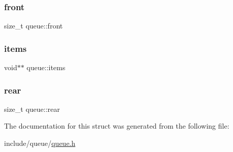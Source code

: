 \subsubsection{\texorpdfstring{front}{front}}
{\footnotesize\ttfamily size\+\_\+t queue\+::front}

\mbox{\label{structqueue_a4c90fc914a6825a61866f13ce4fdb225}} 
\subsubsection{\texorpdfstring{items}{items}}
{\footnotesize\ttfamily void$\ast$$\ast$ queue\+::items}

\mbox{\label{structqueue_a71eff21c56cc3644a766901cd21f773d}} 
\subsubsection{\texorpdfstring{rear}{rear}}
{\footnotesize\ttfamily size\+\_\+t queue\+::rear}



The documentation for this struct was generated from the following file\+:\begin{DoxyCompactItemize}
\item 
include/queue/\mbox{\hyperlink{queue_8h}{queue.\+h}}\end{DoxyCompactItemize}

